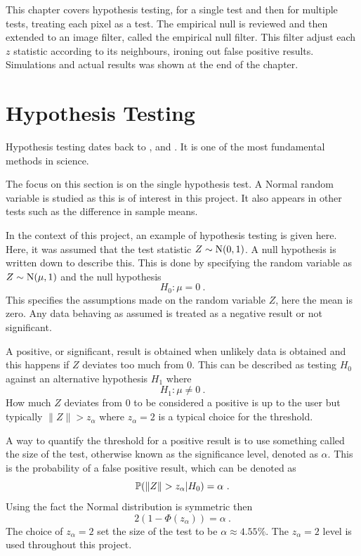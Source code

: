 This chapter covers hypothesis testing, for a single test and then for multiple tests, treating each pixel as a test. The empirical null is reviewed and then extended to an image filter, called the empirical null filter. This filter adjust each $z$ statistic according to its neighbours, ironing out false positive results. Simulations and actual results was shown at the end of the chapter.

\section{Hypothesis Testing}

Hypothesis testing dates back to \cite{pearson1900on}, \cite{neyman1933on} and \cite{fisher1970statistical}. It is one of the most fundamental methods in science.

The focus on this section is on the single hypothesis test. A Normal random variable is studied as this is of interest in this project. It also appears in other tests such as the difference in sample means.

In the context of this project, an example of hypothesis testing is given here. Here, it was assumed that the test statistic $Z\sim\operatorname{N}(0,1)$. A null hypothesis is written down to describe this. This is done by specifying the random variable as $Z\sim\operatorname{N}(\mu,1)$ and the null hypothesis
\begin{equation}
    H_0:\mu=0 \ .
\end{equation}
This specifies the assumptions made on the random variable $Z$, here the mean is zero. Any data behaving as assumed is treated as a negative result or not significant.

A positive, or significant, result is obtained when unlikely data is obtained and this happens if $Z$ deviates too much from 0. This can be described as testing $H_0$ against an alternative hypothesis $H_1$ where
\begin{equation}
    H_1:\mu\neq0 \ .
\end{equation}
How much $Z$ deviates from 0 to be considered a positive is up to the user but typically $\|Z\|>z_\alpha$ where $z_\alpha =2$ is a typical choice for the threshold.

A way to quantify the threshold for a positive result is to use something called the size of the test, otherwise known as the significance level, denoted as $\alpha$. This is the probability of a false positive result, which can be denoted as
\begin{equation}
    \prob(\|Z\|>z_\alpha|H_0) = \alpha \ .
\end{equation}
Using the fact the Normal distribution is symmetric then
\begin{equation}
    2(1 - \Phi(z_\alpha)) = \alpha \ .
    \label{eq:inference_single_alpha}
\end{equation}
The choice of $z_\alpha=2$ set the size of the test to be $\alpha\approx 4.55\%$. The $z_\alpha=2$ level is used throughout this project.

